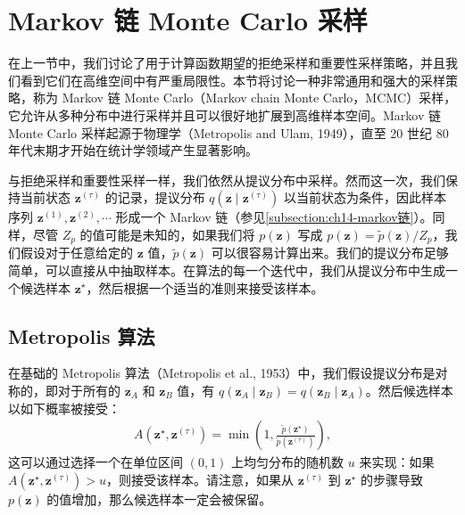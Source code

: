 \documentclass[../../main.tex]{subfiles}
\begin{document}
\section{Markov 链 Monte Carlo 采样}\label{section:ch14-mcmc}

在上一节中，我们讨论了用于计算函数期望的拒绝采样和重要性采样策略，并且我们看到它们在高维空间中有严重局限性。本节将讨论一种非常通用和强大的采样策略，称为 Markov 链 Monte Carlo（Markov chain Monte Carlo，MCMC）采样，它允许从多种分布中进行采样并且可以很好地扩展到高维样本空间。Markov 链 Monte Carlo 采样起源于物理学（Metropolis and Ulam, 1949），直至 20 世纪 80 年代末期才开始在统计学领域产生显著影响。

与拒绝采样和重要性采样一样，我们依然从提议分布中采样。然而这一次，我们保持当前状态 $\bm{z}^{(\tau)}$ 的记录，提议分布 $q\!\left(\bm{z}\mid\bm{z}^{(\tau)}\right)$ 以当前状态为条件，因此样本序列 $\bm{z}^{(1)},\bm{z}^{(2)},\cdots$ 形成一个 Markov 链（参见\cref{subsection:ch14-markov链}）。同样，尽管 $Z_{p}$ 的值可能是未知的，如果我们将 $p(\bm{z})$ 写成 $p(\bm{z})=\widetilde{p}(\bm{z})/Z_{p}$，我们假设对于任意给定的 $\bm{z}$ 值，$\widetilde{p}(\bm{z})$ 可以很容易计算出来。我们的提议分布足够简单，可以直接从中抽取样本。在算法的每一个迭代中，我们从提议分布中生成一个候选样本 $\bm{z}^{\star}$，然后根据一个适当的准则来接受该样本。

\subsection{Metropolis 算法}\label{subsection:ch14-Metropolis算法}

在基础的 Metropolis 算法（Metropolis et al., 1953）中，我们假设提议分布是对称的，即对于所有的 $\bm{z}_{A}$ 和 $\bm{z}_{B}$ 值，有 $q\!\left(\bm{z}_{A}\mid\bm{z}_{B}\right)=q\!\left(\bm{z}_{B}\mid\bm{z}_{A}\right)$。然后候选样本以如下概率被接受：
\begin{align}
A\!\left(\bm{z}^{\star},\bm{z}^{(\tau)}\right)=\min\left(1,\frac{\widetilde{p}\!\left(\bm{z}^{\star}\right)}{\widetilde{p}\!\left(\bm{z}^{(\tau)}\right)}\right),
\label{align:ch14-metropolis接受概率}
\end{align}
这可以通过选择一个在单位区间 $(0,1)$ 上均匀分布的随机数 $u$ 来实现：如果 $A\!\left(\bm{z}^{\star},\bm{z}^{(\tau)}\right)>u$，则接受该样本。请注意，如果从 $\bm{z}^{(\tau)}$ 到 $\bm{z}^{\star}$ 的步骤导致 $p(\bm{z})$ 的值增加，那么候选样本一定会被保留。
\end{document}
